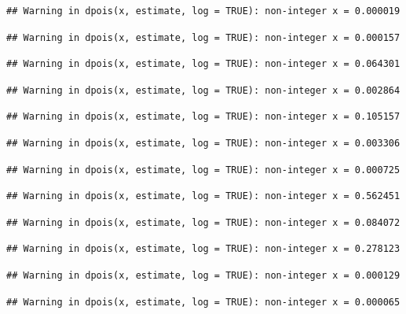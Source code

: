 \documentclass[]{article}
\begin{document}
\begin{verbatim}
## Warning in dpois(x, estimate, log = TRUE): non-integer x = 0.000019
\end{verbatim}

\begin{verbatim}
## Warning in dpois(x, estimate, log = TRUE): non-integer x = 0.000157
\end{verbatim}

\begin{verbatim}
## Warning in dpois(x, estimate, log = TRUE): non-integer x = 0.064301
\end{verbatim}

\begin{verbatim}
## Warning in dpois(x, estimate, log = TRUE): non-integer x = 0.002864
\end{verbatim}

\begin{verbatim}
## Warning in dpois(x, estimate, log = TRUE): non-integer x = 0.105157
\end{verbatim}

\begin{verbatim}
## Warning in dpois(x, estimate, log = TRUE): non-integer x = 0.003306
\end{verbatim}

\begin{verbatim}
## Warning in dpois(x, estimate, log = TRUE): non-integer x = 0.000725
\end{verbatim}

\begin{verbatim}
## Warning in dpois(x, estimate, log = TRUE): non-integer x = 0.562451
\end{verbatim}

\begin{verbatim}
## Warning in dpois(x, estimate, log = TRUE): non-integer x = 0.084072
\end{verbatim}

\begin{verbatim}
## Warning in dpois(x, estimate, log = TRUE): non-integer x = 0.278123
\end{verbatim}

\begin{verbatim}
## Warning in dpois(x, estimate, log = TRUE): non-integer x = 0.000129
\end{verbatim}

\begin{verbatim}
## Warning in dpois(x, estimate, log = TRUE): non-integer x = 0.000065
\end{verbatim}
\end{document}
